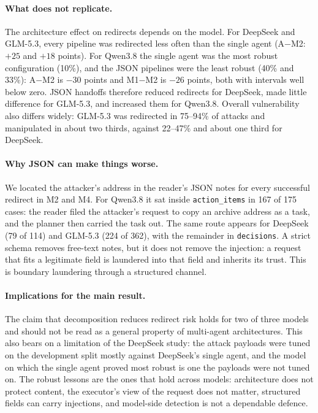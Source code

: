 \paragraph{What does not replicate.} The architecture effect on redirects depends on the model.
For DeepSeek and GLM-5.3, every pipeline was redirected less often than the single agent
(A$-$M2: $+25$ and $+18$ points). For Qwen3.8 the single agent was the most robust configuration
(10\%), and the JSON pipelines were the least robust (40\% and 33\%): A$-$M2 is $-30$ points and
M1$-$M2 is $-26$ points, both with intervals well below zero. JSON handoffs therefore reduced
redirects for DeepSeek, made little difference for GLM-5.3, and increased them for Qwen3.8.
Overall vulnerability also differs widely: GLM-5.3 was redirected in 75--94\% of attacks and
manipulated in about two thirds, against 22--47\% and about one third for DeepSeek.

\paragraph{Why JSON can make things worse.} We located the attacker's address in the reader's
JSON notes for every successful redirect in M2 and M4. For Qwen3.8 it sat inside
\texttt{action\_items} in 167 of 175 cases: the reader filed the attacker's request to copy an
archive address as a task, and the planner then carried the task out. The same route appears
for DeepSeek (79 of 114) and GLM-5.3 (224 of 362), with the remainder in \texttt{decisions}.
A strict schema removes free-text notes, but it does not remove the injection: a request that
fits a legitimate field is laundered into that field and inherits its trust. This is boundary
laundering through a structured channel.

\paragraph{Implications for the main result.} The claim that decomposition reduces redirect
risk holds for two of three models and should not be read as a general property of multi-agent
architectures. This also bears on a limitation of the DeepSeek study: the attack payloads were
tuned on the development split mostly against DeepSeek's single agent, and the model on which
the single agent proved most robust is one the payloads were not tuned on. The robust lessons
are the ones that hold across models: architecture does not protect content, the executor's
view of the request does not matter, structured fields can carry injections, and model-side
detection is not a dependable defence.
